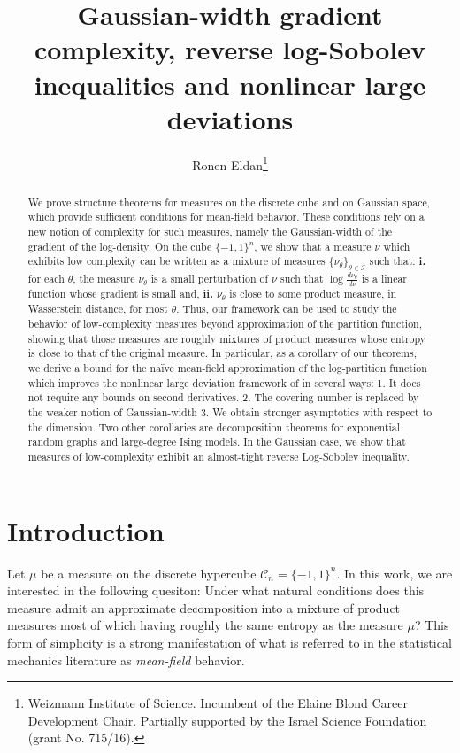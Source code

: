 \documentclass[12pt]{article}
\def \DC {\mathcal{C}_n}
\theoremstyle{definition}
\theoremstyle{remark}
\begin{document}
\title{Gaussian-width gradient complexity, reverse log-Sobolev inequalities and nonlinear large deviations}
\date{}
\author{Ronen Eldan\thanks{Weizmann Institute of Science. Incumbent of the Elaine Blond Career Development Chair. Partially supported by the Israel Science Foundation (grant No. 715/16).}}
\maketitle

\begin{abstract}
We prove structure theorems for measures on the discrete cube and on Gaussian space, which provide sufficient conditions for mean-field behavior. These conditions rely on a new notion of complexity for such measures, namely the Gaussian-width of the gradient of the log-density. On the cube $\{-1,1\}^n$, we show that a measure $\nu$ which exhibits low complexity can be written as a mixture of measures $\{\nu_\theta\}_{\theta \in \mathcal{I}}$ such that: \textbf{i.} for each $\theta$, the measure $\nu_\theta$ is a small perturbation of $\nu$ such that $\log \tfrac{d \nu_\theta}{d \nu}$ is a linear function whose gradient is small and, \textbf{ii.} $\nu_\theta$ is close to some product measure, in Wasserstein distance, for most $\theta$. Thus, our framework can be used to study the behavior of low-complexity measures beyond approximation of the partition function, showing that those measures are roughly mixtures of product measures whose entropy is close to that of the original measure. In particular, as a corollary of our theorems, we derive a bound for the na\"ive mean-field approximation of the log-partition function which improves the nonlinear large deviation framework of \cite{CD14} in several ways: 1. It does not require any bounds on second derivatives. 2. The covering number is replaced by the weaker notion of Gaussian-width 3. We obtain stronger asymptotics with respect to the dimension. Two other corollaries are decomposition theorems for exponential random graphs and large-degree Ising models. In the Gaussian case, we show that measures of low-complexity exhibit an almost-tight reverse Log-Sobolev inequality. 
\end{abstract}

\tableofcontents

\section{Introduction}
Let $\mu$ be a measure on the discrete hypercube $\DC= \{-1,1\}^n$. In this work, we are interested in the following quesiton: Under what natural conditions does this measure admit an approximate decomposition into a mixture of product measures most of which having roughly the same entropy as the measure $\mu$? This form of simplicity is a strong manifestation of what is referred to in the statistical mechanics literature as \textit{mean-field} behavior.
\end{document}

